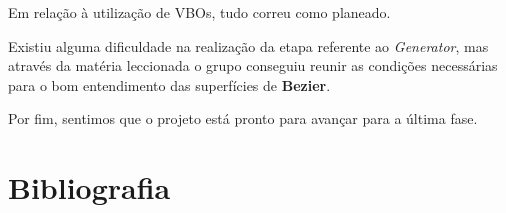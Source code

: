 \documentclass[a4paper]{article}
\begin{document}
Em relação à utilização de VBOs, tudo correu como planeado.

Existiu alguma dificuldade na realização da etapa referente ao \textit{Generator}, mas através da matéria leccionada o grupo conseguiu reunir as condições necessárias para o bom entendimento das superfícies de \textbf{Bezier}.

Por fim, sentimos que o projeto está pronto para avançar para a última fase.

\section{Bibliografia}
\label{sec:bibliografia}
\end{document}
